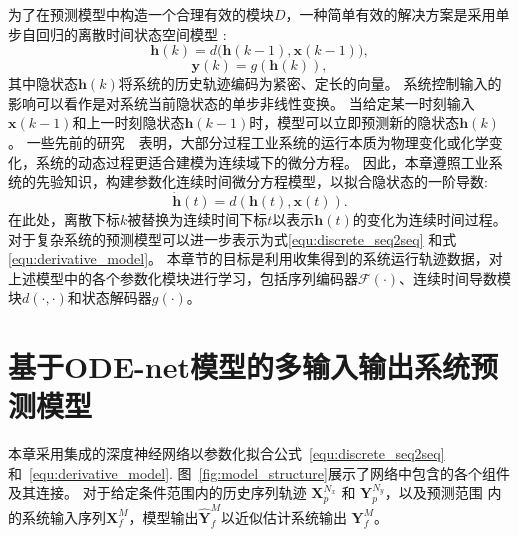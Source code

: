 为了在预测模型中构造一个合理有效的模块$D$，一种简单有效的解决方案是采用单步自回归的离散时间状态空间模型 \cite{4019326}:
\begin{equation}
\label{equ:discrete_state_space}
\boldsymbol{h}(k)=d\big(\boldsymbol{h}(k-1), \boldsymbol{x}(k-1)\big),
\end{equation}
\begin{equation}
\boldsymbol{y}(k)=g(\boldsymbol{h}(k)),
\end{equation}
其中隐状态$\boldsymbol{h}(k)$将系统的历史轨迹编码为紧密、定长的向量。
系统控制输入的影响可以看作是对系统当前隐状态的单步非线性变换。
当给定某一时刻输入$\boldsymbol{x}(k-1)$和上一时刻隐状态$\boldsymbol{h}(k-1)$时，模型可以立即预测新的隐状态$\boldsymbol{h}(k)$。
一些先前的研究~\cite{CHAI201661}~\cite{KIM2004403}表明，大部分过程工业系统的运行本质为物理变化或化学变化，系统的动态过程更适合建模为连续域下的微分方程。
因此，本章遵照工业系统的先验知识，构建参数化连续时间微分方程模型，以拟合隐状态的一阶导数:
\begin{equation}
    \label{equ:derivative_model}
    \dot{\boldsymbol h}(t) = d(\boldsymbol{h}(t), \boldsymbol x(t)).
\end{equation}
在此处，离散下标$k$被替换为连续时间下标$t$以表示$\boldsymbol{h}(t)$的变化为连续时间过程。
对于复杂系统的预测模型可以进一步表示为式\eqref{equ:discrete_seq2seq} 和式 \eqref{equ:derivative_model}。
本章节的目标是利用收集得到的系统运行轨迹数据，对 上述模型中的各个参数化模块进行学习，包括序列编码器$\mathcal{F}(\cdot)$、连续时间导数模块$d(\cdot,\cdot)$和状态解码器$g(\cdot)$。
\section{基于ODE-net模型的多输入输出系统预测模型}
\label{sec:model}
本章采用集成的深度神经网络以参数化拟合公式~\eqref{equ:discrete_seq2seq}和~\eqref{equ:derivative_model}.
图~\ref{fig:model_structure}展示了网络中包含的各个组件及其连接。
对于给定条件范围内的历史序列轨迹 $\boldsymbol{X}_{p}^{N_{x}}$ 和 $\boldsymbol{Y}_{p}^{N_{y}}$，以及预测范围 内的系统输入序列$\boldsymbol{X}_{f}^{M}$，模型输出$\hat{\boldsymbol{Y}}_{f}^{M}$以近似估计系统输出 $\boldsymbol{Y}_{f}^{M}$。

